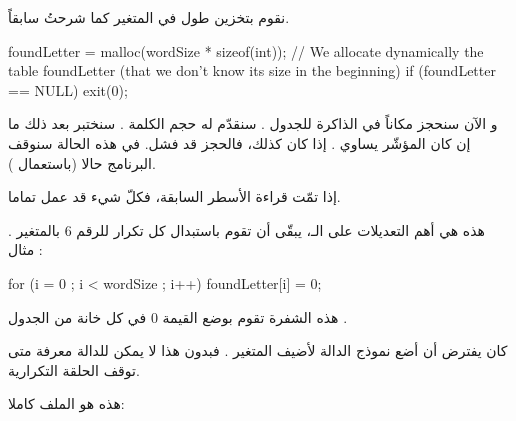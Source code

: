 نقوم بتخزين طول
في المتغير
كما شرحتُ سابقاً.

\begin{Csource}
foundLetter = malloc(wordSize  * sizeof(int)); // We allocate dynamically the table foundLetter (that we don't know its size in the beginning)
if (foundLetter  == NULL)
	 exit(0);
\end{Csource}

و الآن سنحجز مكاناً في الذاكرة للجدول
.
سنقدّم له حجم الكلمة
.
سنختبر بعد ذلك ما إن كان المؤشّر يساوي
.
إذا كان كذلك، فالحجز قد فشل. في هذه الحالة سنوقف البرنامج حالا (باستعمال
).

إذا تمّت قراءة الأسطر السابقة، فكلّ شيء قد عمل تماما.

هذه هي أهم التعديلات على الـ،
يبقّى أن تقوم باستبدال كل تكرار للرقم 6 بالمتغير
.
مثال :

\begin{Csource}
  for (i = 0 ; i < wordSize ; i++)
  	foundLetter[i] = 0;
\end{Csource}

هذه الشفرة تقوم بوضع القيمة 0 في كل خانة من الجدول
.

كان يفترض أن أضع نموذج الدالة
لأضيف المتغير
.
فبدون هذا لا يمكن للدالة معرفة متى توقف الحلقة التكرارية.

هذه هو الملف
كاملا:

